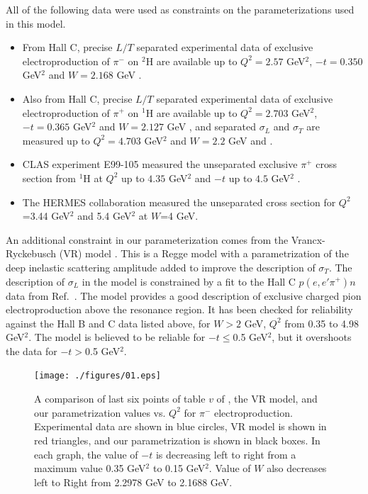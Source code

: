 All of the following data were used as constraints on the parameterizations
used in this model.
\begin{itemize}
\item
From Hall C, precise $L/T$ separated experimental data of exclusive
electroproduction of $\pi^{-}$ on $^2$H are available up to $Q^2=2.57$ GeV$^2$,
$-t=0.350$ GeV$^2$ and $W=2.168$ GeV \cite{gmhuber-2}.
\item
Also from Hall C, precise $L/T$ separated experimental data of exclusive
electroproduction of $\pi^{+}$ on $^1$H are available up to $Q^2=2.703$
GeV$^2$, $-t=0.365$ GeV$^2$ and $W=2.127$ GeV \cite{Fpi2}, and separated
$\sigma_{L}$ and $\sigma_{T}$ are measured up to $Q^2=4.703$ GeV$^2$ and
$W=2.2$ GeV \cite{hallc-1} and \cite{hallc-2}.
\item
CLAS experiment E99-105 measured the unseparated exclusive $\pi^+$ cross
section from $^1$H at $Q^2$ up to $4.35$ GeV$^2$ and $-t$ up to $4.5$ GeV$^2$
\cite{park}.
\item
The HERMES collaboration measured the unseparated cross section for $Q^2$=3.44
GeV$^2$ and 5.4 GeV$^2$ \cite{hermes} at $W$=4 GeV.
\end{itemize}

An additional constraint in our parameterization comes from the
Vrancx-Ryckebusch (VR) model \cite{vr}.  This is a Regge model with a
parametrization of the deep inelastic scattering amplitude added to improve the
description of $\sigma_{T}$.  The description of $\sigma_{L}$ in the model is
constrained by a fit to the Hall C $p(e,e'\pi^+)n$ data from
Ref.~\cite{gmhuber}.  The model provides a good description of exclusive
charged pion electroproduction above the resonance region.  It has been checked
for reliability against the Hall B and C data listed above, for $W>2$ GeV,
$Q^2$ from 0.35 to 4.98 GeV$^2$.  The model is believed to be reliable for
$-t\leq$0.5 GeV$^2$, but it overshoots the data for $-t>$0.5 GeV$^2$.

\begin{figure}[!hbt]
    \centering
    \texttt{[image: ./figures/01.eps]}
    \caption{ A comparison of last six points of table $v$ of \cite{gmhuber-2},
      the VR model, and our parametrization values vs. $Q^{2}$ for $\pi^{-}$
      electroproduction. Experimental data are shown in blue circles, VR model
      is shown in red triangles, and our parametrization is shown in black
      boxes. In each graph, the value of $-t$ is decreasing left to right from
      a maximum value 0.35 GeV$^2$ to 0.15 GeV$^2$. Value of $W$ also decreases
      left to Right from 2.2978 GeV to 2.1688 GeV.}
    \label{fig:expvrfit}
\end{figure}

